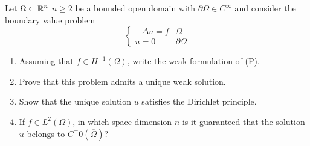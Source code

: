 \newpage
\begin{exercise}
    Let \(\Omega \subset \mathbb{R}^n\) \(n \geq 2\) be a bounded open domain with \(\partial\Omega \in C^\infty\) and consider the boundary value problem
    \[
        \begin{cases}
            -\Delta u = f & \Omega \\
            u = 0 & \partial\Omega
        \end{cases}
        \tag*{(P)}
    \]
    \begin{enumerate}
        \item Assuming that \(f \in H^{-1}(\Omega)\), write the weak formulation of (P).
        \item Prove that this problem admits a unique weak solution.
        \item Show that the unique solution \(u\) satisfies the Dirichlet principle.
        \item If \(f \in L^2(\Omega)\), in which space dimension \(n\) is it guaranteed that the solution \(u\) belongs to \(C^=0(\overline{\Omega})\)?
    \end{enumerate}
\end{exercise}
